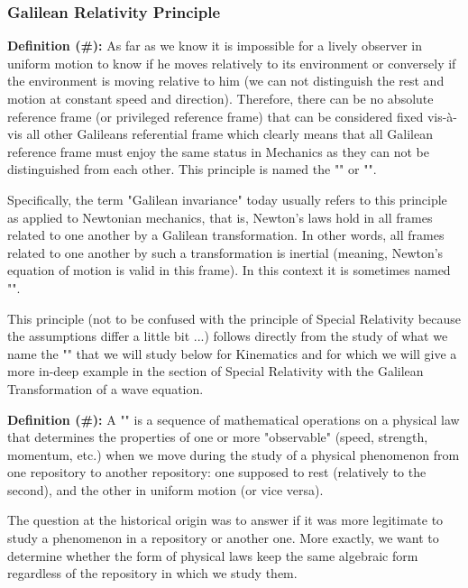 	\subsubsection{Galilean Relativity Principle}
	\textbf{Definition (\#\mydef):} As far as we know it is impossible for a lively observer in uniform motion to know if he moves relatively to its environment or conversely if the environment is moving relative to him (we can not distinguish the rest and motion at constant speed and direction). Therefore, there can be no absolute reference frame (or privileged reference frame) that can be considered fixed vis-à-vis all other Galileans referential frame which clearly means that all Galilean reference frame must enjoy the same status in Mechanics as they can not be distinguished from each other. This principle is named the "" or "".
	
	Specifically, the term "Galilean invariance" today usually refers to this principle as applied to Newtonian mechanics, that is, Newton's laws hold in all frames related to one another by a Galilean transformation. In other words, all frames related to one another by such a transformation is inertial (meaning, Newton's equation of motion is valid in this frame). In this context it is sometimes named "".
	
	This principle (not to be confused with the principle of Special Relativity because the assumptions differ a little bit ...) follows directly from the study of what we name the "" that we will study below for Kinematics and for which we will give a more in-deep example in the section of Special Relativity with the Galilean Transformation of a wave equation.
	
	\textbf{Definition (\#\mydef):} A "" is a sequence of mathematical operations on a physical law that determines the properties of one or more "observable" (speed, strength, momentum, etc.) when we move during the study of a physical phenomenon from one repository to another repository: one supposed to rest (relatively to the second), and the other in uniform motion (or vice versa).
	
	The question at the historical origin was to answer if it was more legitimate to study a phenomenon in a repository or another one. More exactly, we want to determine whether the form of physical laws keep the same algebraic form regardless of the repository in which we study them.

